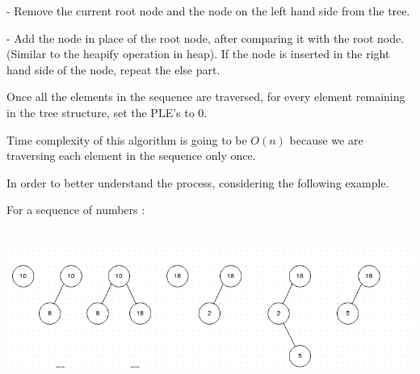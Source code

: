 \documentclass[letterpaper,portrait,12pt]{article}
\begin{document}
\begin{flushleft}
- Remove the current root node and the node on the left hand side from the tree.
\end{flushleft}


\begin{flushleft}
- Add the node in place of the root node, after comparing it with the root node. (Similar to the heapify operation in heap). If the node is inserted in the right hand side of the node, repeat the else part.
\end{flushleft}


\begin{flushleft}

\end{flushleft}


\begin{flushleft}
Once all the elements in the sequence are traversed, for every element remaining in the tree structure, set the PLE's to 0.
\end{flushleft}


\begin{flushleft}

\end{flushleft}


\begin{flushleft}
Time complexity of this algorithm is going to be $O(n)$ because we are traversing each element in the  sequence only once.
\end{flushleft}


\begin{flushleft}

\end{flushleft}


\begin{flushleft}

\end{flushleft}


\begin{flushleft}
	In order to better understand the process, considering the following example.
\end{flushleft}


\begin{flushleft}
	For a sequence of numbers : 
\end{flushleft}


\begin{flushleft}

\end{flushleft}


\begin{flushleft}
\includegraphics[height=2.0153in,width=6.5972in]{914f4600-1aac-11e3-96b1-99a1a326a3b2.png}

\end{flushleft}
\end{document}
